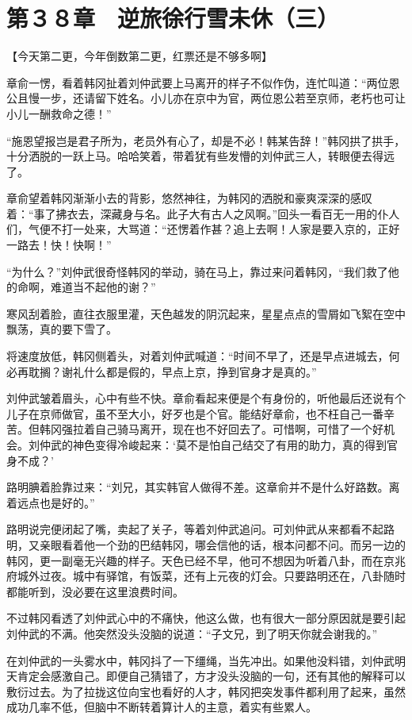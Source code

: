 \section{第３８章　逆旅徐行雪未休（三）}

【今天第二更，今年倒数第二更，红票还是不够多啊】

章俞一愣，看着韩冈扯着刘仲武要上马离开的样子不似作伪，连忙叫道：“两位恩公且慢一步，还请留下姓名。小儿亦在京中为官，两位恩公若至京师，老朽也可让小儿一酬救命之德！”

“施恩望报岂是君子所为，老员外有心了，却是不必！韩某告辞！”韩冈拱了拱手，十分洒脱的一跃上马。哈哈笑着，带着犹有些发懵的刘仲武三人，转眼便去得远了。

章俞望着韩冈渐渐小去的背影，悠然神往，为韩冈的洒脱和豪爽深深的感叹着：“事了拂衣去，深藏身与名。此子大有古人之风啊。”回头一看百无一用的仆人们，气便不打一处来，大骂道：“还愣着作甚？追上去啊！人家是要入京的，正好一路去！快！快啊！”

“为什么？”刘仲武很奇怪韩冈的举动，骑在马上，靠过来问着韩冈，“我们救了他的命啊，难道当不起他的谢？”

寒风刮着脸，直往衣服里灌，天色越发的阴沉起来，星星点点的雪屑如飞絮在空中飘荡，真的要下雪了。

将速度放低，韩冈侧着头，对着刘仲武喊道：“时间不早了，还是早点进城去，何必再耽搁？谢礼什么都是假的，早点上京，挣到官身才是真的。”

刘仲武皱着眉头，心中有些不快。章俞看起来便是个有身份的，听他最后还说有个儿子在京师做官，虽不至大小，好歹也是个官。能结好章俞，也不枉自己一番辛苦。但韩冈强拉着自己骑马离开，现在也不好回去了。可惜啊，可惜了一个好机会。刘仲武的神色变得冷峻起来：‘莫不是怕自己结交了有用的助力，真的得到官身不成？’

路明腆着脸靠过来：“刘兄，其实韩官人做得不差。这章俞并不是什么好路数。离着远点也是好的。”

路明说完便闭起了嘴，卖起了关子，等着刘仲武追问。可刘仲武从来都看不起路明，又亲眼看着他一个劲的巴结韩冈，哪会信他的话，根本问都不问。而另一边的韩冈，更一副毫无兴趣的样子。天色已经不早，他可不想因为听着八卦，而在京兆府城外过夜。城中有驿馆，有饭菜，还有上元夜的灯会。只要路明还在，八卦随时都能听到，没必要在这里浪费时间。

不过韩冈看透了刘仲武心中的不痛快，他这么做，也有很大一部分原因就是要引起刘仲武的不满。他突然没头没脑的说道：“子文兄，到了明天你就会谢我的。”

在刘仲武的一头雾水中，韩冈抖了一下缰绳，当先冲出。如果他没料错，刘仲武明天肯定会感激自己。即便自己猜错了，方才没头没脑的一句，还有其他的解释可以敷衍过去。为了拉拢这位向宝也看好的人才，韩冈把突发事件都利用了起来，虽然成功几率不低，但脑中不断转着算计人的主意，着实有些累人。

